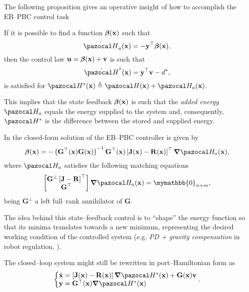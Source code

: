 The following proposition gives an operative insight of how to accomplish the EB--PBC control task
%
\begin{prop}\label{prop:ebpbc}
If it is possible to find a function $\bm\beta(\mathbf{x})$ such that
\begin{equation}
    \dot{\Ha}_a(\xb)
    =-\yb^\top\bm\beta(\xb),
\end{equation}
then the control law $\mathbf{u} = \bm\beta(\mathbf{x})+\mathbf{v}$ is such that 
\begin{equation}
    \dot{\Ha}^*(\xb)
    = \yb^\top \vb -d^*,
\end{equation}
is satisfied for $\Ha^*(\xb) \triangleq \Ha(\xb)+\Ha_a(\xb)$.
\end{prop}
This implies that the state feedback $\bm\beta(\mathbf{x})$ is such that the \textit{added energy} $\Ha_a$ equals the energy supplied to the system and, consequently, $\Ha^*$ is the difference between the stored and supplied energy.
%
\newline

%
In  \citep{ortega2008control} the closed-form solution of the EB--PBC controller is given by 
%
\begin{equation}\label{eq:ebpbc}
    \bm\beta(\xb) = -\left(\mathbf{G}^{\top}(\xb)\mathbf{G}(\xb)\right)^{-1}\mathbf{G}^{\top}(\xb)\left[\mathbf{J}(\xb)-\mathbf{R}(\xb)\right]^\top\bm\nabla\Ha_a(\xb),
\end{equation}
%
where $\Ha_a$ satisfies the following matching equations 
%
\begin{equation}
    \begin{bmatrix}\mathbf{G}^{\perp}\left[\mathbf{J}-\mathbf{R}\right]^\top\\\mathbf{G}^\top\end{bmatrix}\bm\nabla\Ha_a(\xb) = \mymathbb{0}_{n+m},
\end{equation}
%
being $\mathbf{G}^{\perp}$ a left full--rank annihilator of $\mathbf{G}$.

The idea behind this state--feedback control is to ``shape'' the energy function so that its minima translates towards a new minimum, representing the desired working condition of the controlled system (e.g. \textit{PD + gravity compensation} in robot regulation, \cite{arimoto1984stability, secchi2007control}).

The closed--loop system might still be rewritten in port--Hamiltonian form as
%
\begin{equation}\label{eq:PHsys_ctrl}
	\left\{
	    \begin{matrix*}[l]
	        \dot{\xb} = \left[\mathbf{J}(\xb) - \mathbf{R}(\xb)\right]\bm{\nabla}\Ha^*(\xb) + \mathbf{G}(\xb)\mathbf{v}\\
	        \mathbf{y} = \mathbf{G}^\top(\xb)\bm{\nabla}\Ha^*(\xb) 
	    \end{matrix*}
	\right..
\end{equation}
%

